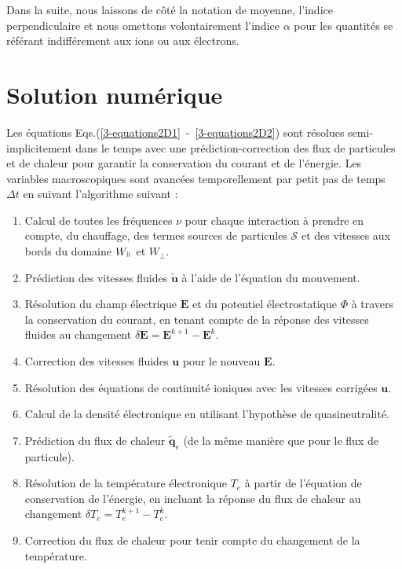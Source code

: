 \begin{refsection}
Dans la suite, nous laissons de côté la notation de moyenne, l'indice
perpendiculaire et nous omettons volontairement l'indice $\alpha$ pour les
quantités se référant indifférement aux ions ou aux électrons.

\section{Solution numérique}

Les équations Eqs.(\ref{3-equations2D1}~-~\ref{3-equations2D2}) sont résolues
semi-implicitement dans le temps avec une prédiction-correction des flux de
particules et de chaleur pour garantir la conservation du courant et de
l'énergie. Les variables macroscopiques sont avancées temporellement par
petit pas de temps $\Delta t$ en suivant l'algorithme suivant :

\begin{enumerate}
  \item Calcul de toutes les fréquences $\nu$ pour
  chaque interaction à prendre en compte, du chauffage, des termes sources de
  particules $\mathcal{S}$ et des vitesses aux bords du domaine $W_{\para}$ et
  $W_{\perp}$.
  \item Prédiction des vitesses fluides $\tilde{\mathbf u}$ à l'aide de
  l'équation du mouvement.
  \item Résolution du champ électrique $\mathbf E$ et du potentiel
  électrostatique $\Phi$ à travers la conservation du courant, en tenant compte de la
  réponse des vitesses fluides au changement $\delta \mathbf
  E=\mathbf E^{k+1}-\mathbf E^{k}$.
  \item Correction des vitesses fluides $\mathbf u$ pour le nouveau
  $\mathbf E$.
  \item Résolution des équations de continuité ioniques avec les vitesses
  corrigées $\mathbf u$.
  \item Calcul de la densité électronique en utilisant l'hypothèse de
  quasineutralité.
  \item Prédiction du flux de chaleur $\tilde{\mathbf q}_e$ (de la même manière
  que pour le flux de particule).
  \item Résolution de la température électronique $T_e$ à partir de l'équation
  de conservation de l'énergie, en incluant la réponse du flux de chaleur au
  changement $\delta T_e=T_e^{k+1}-T_e^{k}$.
  \item Correction du flux de chaleur pour tenir compte du changement de la
  température.
\end{enumerate}


\end{refsection}
